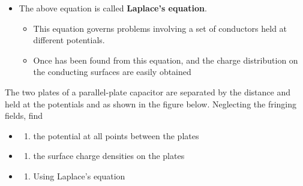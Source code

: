\begin{ELjoin}

\begin{itemize}
\tightlist
\item
  The above equation is called \textbf{Laplace's equation}.

  \begin{itemize}
  \tightlist
  \item
    This equation governs problems involving a set of conductors held at different potentials.
  \item
    Once  has been found from this equation,  and the charge distribution on the conducting surfaces are easily obtained
  \end{itemize}
\end{itemize}



\begin{ELexample}{}

The two plates of a parallel-plate capacitor are separated by the distance  and held at the potentials  and  as shown in the figure below. Neglecting the fringing fields, find

\begin{itemize}
\item
  \begin{enumerate}
  \def\labelenumi{(\alph{enumi})}
  \tightlist
  \item
    the potential at all points between the plates
  \end{enumerate}
\item
  \begin{enumerate}
  \def\labelenumi{(\alph{enumi})}
  \setcounter{enumi}{1}
  \tightlist
  \item
    the surface charge densities on the plates
  \end{enumerate}
\end{itemize}


\begin{ELsolution}

\begin{itemize}
\item
  \begin{enumerate}
  \def\labelenumi{(\alph{enumi})}
  \tightlist
  \item
    Using Laplace's equation
  \end{enumerate}
\end{itemize}


\end{ELsolution}
\end{ELexample}
\end{ELjoin}
